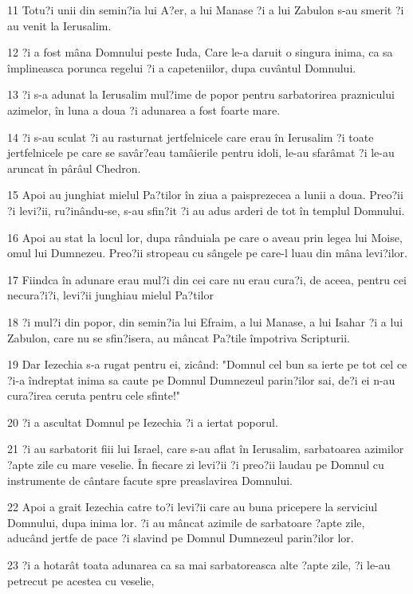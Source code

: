 \par 11 Totu?i unii din semin?ia lui A?er, a lui Manase ?i a lui Zabulon s-au smerit ?i au venit la Ierusalim.
\par 12 ?i a fost mâna Domnului peste Iuda, Care le-a daruit o singura inima, ca sa împlineasca porunca regelui ?i a capeteniilor, dupa cuvântul Domnului.
\par 13 ?i s-a adunat la Ierusalim mul?ime de popor pentru sarbatorirea praznicului azimelor, în luna a doua ?i adunarea a fost foarte mare.
\par 14 ?i s-au sculat ?i au rasturnat jertfelnicele care erau în Ierusalim ?i toate jertfelnicele pe care se savâr?eau tamâierile pentru idoli, le-au sfarâmat ?i le-au aruncat în pârâul Chedron.
\par 15 Apoi au junghiat mielul Pa?tilor în ziua a paisprezecea a lunii a doua. Preo?ii ?i levi?ii, ru?inându-se, s-au sfin?it ?i au adus arderi de tot în templul Domnului.
\par 16 Apoi au stat la locul lor, dupa rânduiala pe care o aveau prin legea lui Moise, omul lui Dumnezeu. Preo?ii stropeau cu sângele pe care-l luau din mâna levi?ilor.
\par 17 Fiindca în adunare erau mul?i din cei care nu erau cura?i, de aceea, pentru cei necura?i?i, levi?ii junghiau mielul Pa?tilor
\par 18 ?i mul?i din popor, din semin?ia lui Efraim, a lui Manase, a lui Isahar ?i a lui Zabulon, care nu se sfin?isera, au mâncat Pa?tile împotriva Scripturii.
\par 19 Dar Iezechia s-a rugat pentru ei, zicând: "Domnul cel bun sa ierte pe tot cel ce ?i-a îndreptat inima sa caute pe Domnul Dumnezeul parin?ilor sai, de?i ei n-au cura?irea ceruta pentru cele sfinte!"
\par 20 ?i a ascultat Domnul pe Iezechia ?i a iertat poporul.
\par 21 ?i au sarbatorit fiii lui Israel, care s-au aflat în Ierusalim, sarbatoarea azimilor ?apte zile cu mare veselie. În fiecare zi levi?ii ?i preo?ii laudau pe Domnul cu instrumente de cântare facute spre preaslavirea Domnului.
\par 22 Apoi a grait Iezechia catre to?i levi?ii care au buna pricepere la serviciul Domnului, dupa inima lor. ?i au mâncat azimile de sarbatoare ?apte zile, aducând jertfe de pace ?i slavind pe Domnul Dumnezeul parin?ilor lor.
\par 23 ?i a hotarât toata adunarea ca sa mai sarbatoreasca alte ?apte zile, ?i le-au petrecut pe acestea cu veselie,
